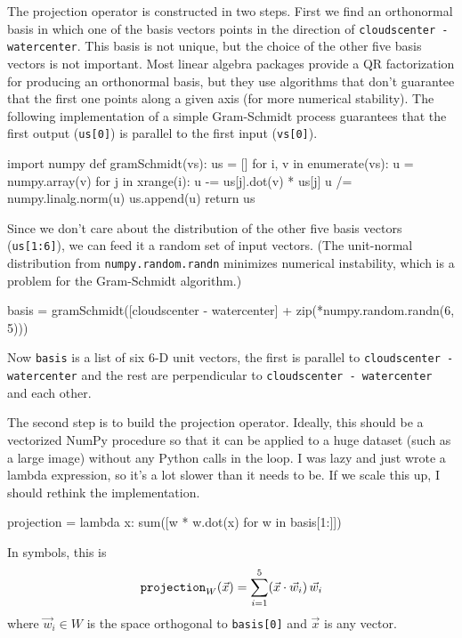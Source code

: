 \documentclass[12pt]{article}
\begin{document}
The projection operator is constructed in two steps.  First we find an
orthonormal basis in which one of the basis vectors points in the
direction of {\tt cloudscenter - watercenter}.  This basis is not
unique, but the choice of the other five basis vectors is not
important.  Most linear algebra packages provide a QR factorization
for producing an orthonormal basis, but they use algorithms that don't
guarantee that the first one points along a given axis (for more
numerical stability).  The following implementation of a simple
Gram-Schmidt process guarantees that the first output ({\tt us[0]}) is
parallel to the first input ({\tt vs[0]}).
\begin{python}
import numpy
def gramSchmidt(vs):
    us = []
    for i, v in enumerate(vs):
        u = numpy.array(v)
        for j in xrange(i):
            u -= us[j].dot(v) * us[j]
        u /= numpy.linalg.norm(u)
        us.append(u)
    return us
\end{python}

Since we don't care about the distribution of the other five basis
vectors ({\tt us[1:6]}), we can feed it a random set of input
vectors.  (The unit-normal distribution from {\tt numpy.random.randn}
minimizes numerical instability, which is a problem for the
Gram-Schmidt algorithm.)
\begin{python}
basis = gramSchmidt([cloudscenter - watercenter] +
                        zip(*numpy.random.randn(6, 5)))
\end{python}
Now {\tt basis} is a list of six 6-D unit vectors, the first is
parallel to {\tt cloudscenter - watercenter} and the rest are
perpendicular to {\tt cloudscenter - watercenter} and each other.

The second step is to build the projection operator.  Ideally, this
should be a vectorized NumPy procedure so that it can be applied to a
huge dataset (such as a large image) without any Python calls in the
loop.  I was lazy and just wrote a lambda expression, so it's a lot
slower than it needs to be.  If we scale this up, I should rethink the
implementation.
\begin{python}
projection = lambda x: sum([w * w.dot(x) for w in basis[1:]])
\end{python}
In symbols, this is
\begin{equation}
\mbox{\tt projection}_W(\vec{x}) = \sum_{i=1}^5 (\vec{x} \cdot \vec{w}_i) \, \vec{w}_i
\end{equation}
where $\vec{w}_i \in W$ is the space orthogonal to {\tt basis[0]} and
$\vec{x}$ is any vector.
\end{document}
